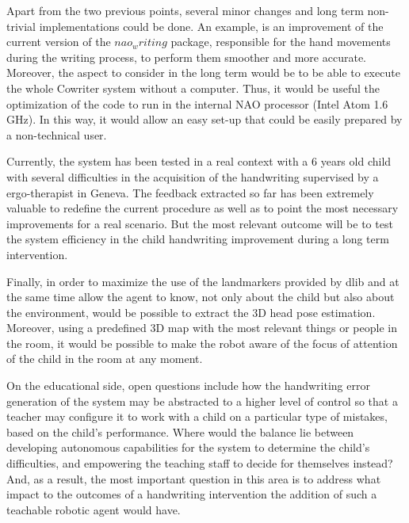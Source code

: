 Apart from the two previous points, several minor changes and long term non-trivial implementations could be done. An example, is an improvement of the current version of the $ nao_writing $ package, responsible for the hand movements during the writing process, to perform them smoother and more accurate. Moreover, the aspect to consider in the long term would be to be able to execute the whole Cowriter system without a computer. Thus, it would be useful the optimization of the code to run in the internal NAO processor (Intel Atom 1.6 GHz). In this way, it would allow an easy set-up that could be easily prepared by a non-technical user.

Currently, the system has been tested in a real context with a 6 years old child with several difficulties in the acquisition of the handwriting supervised by a ergo-therapist in Geneva. The feedback extracted so far has been extremely valuable to redefine the current procedure as well as to point the most necessary improvements for a real scenario. But the most relevant outcome will be to test the system efficiency in the child handwriting improvement during a long term intervention.

Finally, in order to maximize the use of the landmarkers provided by dlib and at the same time allow the agent to know, not only about the child but also about the environment, would be possible to extract the 3D head pose estimation. Moreover, using a predefined 3D map with the most relevant things or people in the room, it would be possible to make the robot aware of the focus of attention of the child in the room at any moment.

On the educational side, open questions include how the handwriting error generation of the
system may be abstracted to a higher level of control so that a teacher may configure it to work
with a child on a particular type of mistakes, based on the child’s performance. Where would
the balance lie between developing autonomous capabilities for the system to determine the
child’s difficulties, and empowering the teaching staff to decide for themselves instead? And,
as a result, the most important question in this area is to address what impact to the outcomes of a handwriting intervention the addition of such a teachable robotic agent would have.
